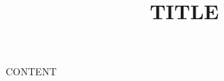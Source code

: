 \documentclass[a4paper,UKenglish,cleveref,autoref,thm-restate,anonymous]{lipics-v2021}
\title{{{TITLE}}}
\begin{document}
\maketitle
\begin{abstract} %
\end{abstract}
\tableofcontents %
{{CONTENT}}

\end{document}
